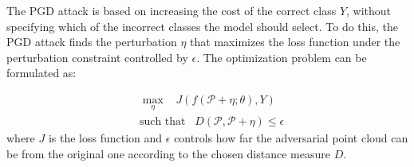 \documentclass{ieeeaccess}
\begin{document}




The PGD attack is based on increasing the cost of the correct class $Y$, without specifying which of the incorrect classes the model should select. To do this, the PGD attack finds the perturbation $\eta$ that maximizes the loss function under the perturbation constraint controlled by $\epsilon$. The optimization problem can be formulated as:


\begin{equation}
\begin{split}
&\max\limits_\eta  \;\;\;    J(f(\mathcal{P}+\eta;\theta),Y)  \\
&\text{such that} \;\;\; D (\mathcal{P} , \mathcal{P}+\eta) \leq \epsilon
 \end{split}
\label{eq:50}
\end{equation}
where $J$ is the loss function and $\epsilon$ controls how far the adversarial point cloud can be from the original one according to the chosen distance measure $D$. %

\end{document}

